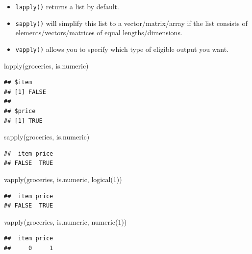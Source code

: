 \documentclass[
  11pt,
]{article}
\newenvironment{Shaded}{\begin{snugshade}}{\end{snugshade}}
\newcommand{\DecValTok}[1]{\textcolor[rgb]{0.00,0.00,0.81}{#1}}
\newcommand{\FunctionTok}[1]{\textcolor[rgb]{0.00,0.00,0.00}{#1}}
\newcommand{\NormalTok}[1]{#1}
\providecommand{\tightlist}{%
  \setlength{\itemsep}{0pt}\setlength{\parskip}{0pt}}
\begin{document}
\begin{itemize}
\tightlist
\item
  \texttt{lapply()} returns a list by default.
\item
  \texttt{sapply()} will simplify this list to a vector/matrix/array if the list consists of elements/vectors/matrices of equal lengths/dimensions.
\item
  \texttt{vapply()} allows you to specify which type of eligible output you want.
\end{itemize}

\begin{Shaded}
\begin{Highlighting}[]
\FunctionTok{lapply}\NormalTok{(groceries, is.numeric)}
\end{Highlighting}
\end{Shaded}

\begin{verbatim}
## $item
## [1] FALSE
## 
## $price
## [1] TRUE
\end{verbatim}

\begin{Shaded}
\begin{Highlighting}[]
\FunctionTok{sapply}\NormalTok{(groceries, is.numeric)}
\end{Highlighting}
\end{Shaded}

\begin{verbatim}
##  item price 
## FALSE  TRUE
\end{verbatim}

\begin{Shaded}
\begin{Highlighting}[]
\FunctionTok{vapply}\NormalTok{(groceries, is.numeric, }\FunctionTok{logical}\NormalTok{(}\DecValTok{1}\NormalTok{))}
\end{Highlighting}
\end{Shaded}

\begin{verbatim}
##  item price 
## FALSE  TRUE
\end{verbatim}

\begin{Shaded}
\begin{Highlighting}[]
\FunctionTok{vapply}\NormalTok{(groceries, is.numeric, }\FunctionTok{numeric}\NormalTok{(}\DecValTok{1}\NormalTok{))}
\end{Highlighting}
\end{Shaded}

\begin{verbatim}
##  item price 
##     0     1
\end{verbatim}
\end{document}
